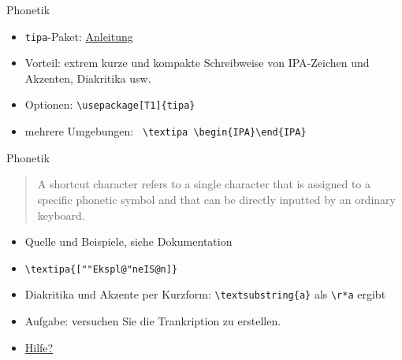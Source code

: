 \begin{frame}[fragile]{Phonetik}
    \begin{itemize}[<+->]
        \item \texttt{tipa}-Paket: \href{ftp://ftp.dante.de/tex-archive/fonts/tipa/tipaman.pdf}{Anleitung}
        \item Vorteil: extrem kurze und kompakte Schreibweise von IPA-Zeichen und Akzenten, Diakritika usw.
        \item Optionen: \lstinline|\usepackage[T1]{tipa}|
        \item mehrere Umgebungen: \lstinline| \textipa \begin{IPA}\end{IPA}|
    \end{itemize}
\end{frame}

\begin{frame}[fragile]{Phonetik}
    \begin{quote}
        A shortcut character refers to a single character that is assigned to a specific phonetic symbol and that can be directly inputted by an ordinary keyboard.
    \end{quote}
    \begin{itemize}[<+->]
        \item Quelle und Beispiele, siehe Dokumentation
        \item \lstinline|\textipa{[""Ekspl@"neIS@n]}| \is {}
        \item Diakritika und Akzente per Kurzform: \lstinline|\textsubstring{a}| als \lstinline|\r*a| ergibt 
        \item Aufgabe: versuchen Sie die Trankription  zu erstellen.
        \item \href{http://meluhha.com/tableau/tipa.html}{Hilfe?}
    \end{itemize}
\end{frame}